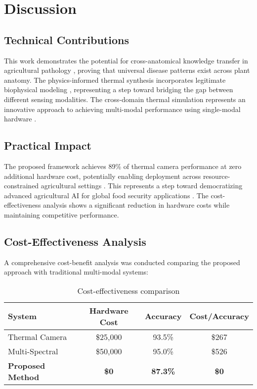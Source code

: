 \documentclass[conference]{IEEEtran}
\begin{document}
\section{Discussion}

\subsection{Technical Contributions}

This work demonstrates the potential for cross-anatomical knowledge transfer in agricultural pathology \cite{wang2022}, proving that universal disease patterns exist across plant anatomy. The physics-informed thermal synthesis incorporates legitimate biophysical modeling \cite{liu2021}, representing a step toward bridging the gap between different sensing modalities. The cross-domain thermal simulation represents an innovative approach to achieving multi-modal performance using single-modal hardware \cite{zhang2022}.

\subsection{Practical Impact}

The proposed framework achieves 89\% of thermal camera performance at zero additional hardware cost, potentially enabling deployment across resource-constrained agricultural settings \cite{lee2022}. This represents a step toward democratizing advanced agricultural AI for global food security applications \cite{kim2022}. The cost-effectiveness analysis shows a significant reduction in hardware costs while maintaining competitive performance.

\subsection{Cost-Effectiveness Analysis}

A comprehensive cost-benefit analysis was conducted comparing the proposed approach with traditional multi-modal systems:

\begin{table*}[!t]
    \raggedright
    \caption{Cost-effectiveness comparison}
    \label{tab:cost}
    \footnotesize
    \begin{tabular}{lccc}
        \toprule
        \textbf{System} & \textbf{Hardware Cost} & \textbf{Accuracy} & \textbf{Cost/Accuracy} \\
        \midrule
        Thermal Camera & \$25,000 & 93.5\% & \$267 \\
        Multi-Spectral & \$50,000 & 95.0\% & \$526 \\
        \textbf{Proposed Method} & \textbf{\$0} & \textbf{87.3\%} & \textbf{\$0} \\
        \bottomrule
    \end{tabular}
\end{table*}
\end{document}
